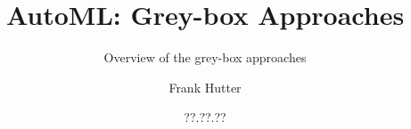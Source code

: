 %




\title[AutoML: Grey-box Approaches]{AutoML: Grey-box Approaches}
\subtitle{Overview of the grey-box approaches}
\author[Frank Hutter]{Frank Hutter}
\date{??.??.??}





	
	\maketitle


	








